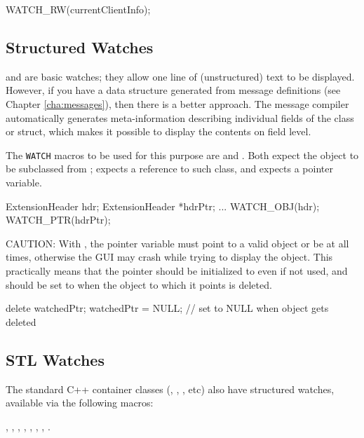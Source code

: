 \begin{cpp}
WATCH_RW(currentClientInfo);
\end{cpp}


\subsection{Structured Watches}

 and  are basic watches; they allow one
line of (unstructured) text to be displayed. However, if you have a
data structure generated from message definitions (see Chapter \ref{cha:messages}),
then there is a better approach. The message compiler automatically generates
meta-information describing individual fields of the class or struct,
which makes it possible to display the contents on field level.

The \texttt{WATCH} macros to be used for this purpose are 
and . Both expect the object to be subclassed from
;  expects a reference to such class,
and  expects a pointer variable.

\begin{cpp}
ExtensionHeader hdr;
ExtensionHeader *hdrPtr;
...
WATCH_OBJ(hdr);
WATCH_PTR(hdrPtr);
\end{cpp}

CAUTION: With , the pointer variable must point to a valid
object or be  at all times, otherwise the GUI may crash
while trying to display the object. This practically means that
the pointer should be initialized to  even if not used, and
should be set to  when the object to which it points is deleted.

\begin{cpp}
delete watchedPtr;
watchedPtr = NULL;  // set to NULL when object gets deleted
\end{cpp}


\subsection{STL Watches}

The standard C++ container classes (, , , etc)
also have structured watches, available via the following macros:

, ,
, ,
, ,
, .

